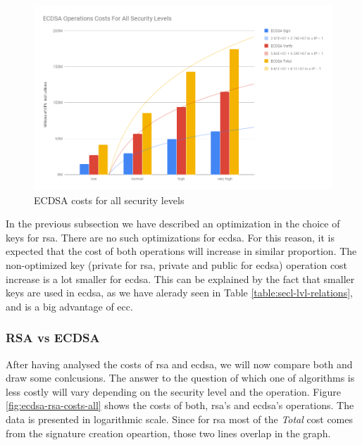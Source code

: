 \documentclass{llncs}
\begin{document}
\begin{figure}
  \centering
  \includegraphics[width=1.0\textwidth]{img/ecdsa_cost_all_sls.png}
  \centering \caption{\label{fig:ecdsa-costs-all-sls} ECDSA costs for all security levels}
\end{figure}

In the previous subsection we have described an optimization in the choice of keys for \gls{rsa}. There are no such optimizations 
for \gls{ecdsa}. For this reason, it is expected that the cost of both operations will increase in similar proportion. The non-optimized
key (private for \gls{rsa}, private and public for \gls{ecdsa}) operation cost increase is a lot smaller for \gls{ecdsa}. This can be
explained by the fact that smaller keys are used in \gls{ecdsa}, as we have alerady seen in Table \ref{table:secl-lvl-relations},
and is a big advantage of \gls{ecc}.

\subsubsection{RSA vs ECDSA} \label{sec:rsa-vs-ecdsa}

After having analysed the costs of \gls{rsa} and \gls{ecdsa}, we will now compare both and draw some conlcusions. The answer to the
question of which one of algorithms is less costly will vary depending on the security level and the operation. Figure \ref{fig:ecdsa-rsa-costs-all}
shows the costs of both, \gls{rsa}'s and \gls{ecdsa}'s operations. The data is presented in logarithmic scale. Since for \gls{rsa} most
of the \textit{Total} cost comes from the signature creation opeartion, those two lines overlap in the graph.
\end{document}
